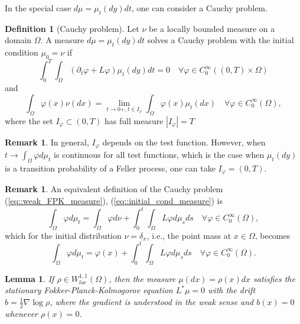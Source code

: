 \documentclass[11pt]{article}
\numberwithin{equation}{section}
\newtheorem{lemma}[theorem]{Lemma}
\theoremstyle{definition}
\newtheorem{definition}[theorem]{Definition}
\newtheorem{remark}[theorem]{Remark}
\begin{document}
In the special case $d\mu = \mu_{t}(dy)dt$, one can consider a Cauchy problem.
\begin{definition}[Cauchy problem]
Let $\nu$ be a locally bounded measure on a domain $\Omega$. A measure $d\mu = \mu_{t}(dy)dt$ solves a Cauchy problem with the initial condition $\mu_{0}= \nu$ if 
\begin{equation}\label{eq::weak_FPK_measure}
    \int_{0}^{T}\int_{\Omega}(\partial_{t}\varphi+ L\varphi)\mu_{t}(dy)dt 
    = 0 \quad \forall\varphi\in C^{\infty}_{0}((0,T)\times \Omega)
\end{equation}
and
\begin{equation}\label{eq::initial_cond_measure}
    \int_{\Omega}\varphi(x)\nu(dx)
    =\lim\limits_{t\to 0+, t\in I_{\varphi}}\int_{\Omega}\varphi(x)\mu_{t}(dx) 
    \quad\forall\varphi\in C^{\infty}_{0}(\Omega),
\end{equation}
where the set $I_{\varphi}\subset (0,T)$ has full measure $|I_{\varphi}|=T$
\end{definition}
\begin{remark}
In general, $I_{\varphi}$ depends on the test function. However, when $t\to\int_{\Omega}\varphi d\mu_{t}$ is continuous for all test functions, which is the case when $\mu_{t}(dy)$ is a transition probability of a Feller process, one can take $I_{\varphi} = (0,T)$.

    
\end{remark}
\begin{remark}
An equivalent definition of the Cauchy problem (\ref{eq::weak_FPK_measure}), (\ref{eq::initial_cond_measure}) is
\[
    \int_{\Omega}\varphi d\mu_{t} 
    = \int_{\Omega}\varphi d\nu + \int_{0}^{t}\int_{\Omega}L\varphi d\mu_{s}ds
    \quad\forall \varphi\in C^{\infty}_{0}(\Omega),
\]
which for the initial distribution $\nu = \delta_{x}$, i.e., the point mass at $x\in \Omega$, becomes
\begin{equation}\label{eq::Cauchy_probem_x}
    \int_{\Omega}\varphi d\mu_{t} 
    = \varphi(x) + \int_{0}^{t}\int_{\Omega}L\varphi d\mu_{s}ds
    \quad\forall \varphi\in C^{\infty}_{0}(\Omega).
\end{equation}    
\end{remark}
\begin{lemma}
If $\rho\in W^{1,1}_{loc}(\Omega)$, then the measure $\mu(dx) = \rho(x) dx$ satisfies the stationary Fokker-Planck-Kolmogorov equation $L^{*}\mu=0$ with the drift $ b = \frac{1}{2}\nabla\log\rho$, where the gradient is understood in the weak sense and $b(x)=0$ whenever $\rho(x)=0$.
\end{lemma}
\end{document}
